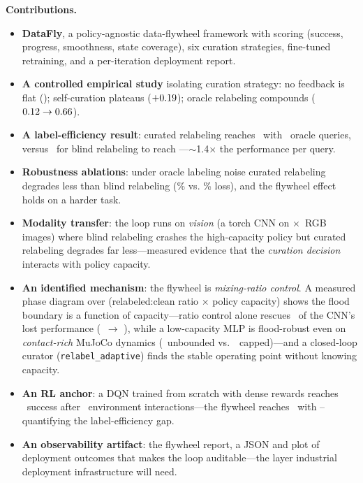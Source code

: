 \documentclass[conference]{IEEEtran}
\begin{document}
\textbf{Contributions.}
\begin{itemize}
\item \textbf{DataFly}, a policy-agnostic data-flywheel framework with
scoring (success, progress, smoothness, state coverage), six curation
strategies, fine-tuned retraining, and a per-iteration deployment report.
\item \textbf{A controlled empirical study} isolating curation strategy:
no feedback is flat (\baseSuccess); self-curation plateaus ($+0.19$);
oracle relabeling compounds ($0.12 \rightarrow 0.66$).
\item \textbf{A label-efficiency result}: curated relabeling reaches
\curatedFinal\ with \curatedQueries\ oracle queries, versus \blindQueries\
for blind relabeling to reach \relabelFinal---$\sim$1.4$\times$ the
performance per query.
\item \textbf{Robustness ablations}: under oracle labeling noise curated
relabeling degrades less than blind relabeling (\curatedDrop\% vs.
\blindDrop\% loss), and the flywheel effect holds on a harder task.
\item \textbf{Modality transfer}: the loop runs on \emph{vision} (a torch
CNN on \visionImg$\times$\visionImg\ RGB images) where blind relabeling
crashes the high-capacity policy but curated relabeling degrades far
less---measured evidence that the \emph{curation decision} interacts with
policy capacity.
\item \textbf{An identified mechanism}: the flywheel is \emph{mixing-ratio
control}. A measured phase diagram over (relabeled:clean ratio $\times$
policy capacity) shows the flood boundary is a function of capacity---ratio
control alone rescues \mixRescueGain\ of the CNN's lost performance
(\mixBlindFinal\ $\rightarrow$ \mixRescueFinal), while a low-capacity MLP
is flood-robust even on \emph{contact-rich} MuJoCo dynamics
(\contactBlindFinal\ unbounded vs.\ \contactMixFinal\ capped)---and a
closed-loop curator (\texttt{relabel\_adaptive}) finds the stable
operating point without knowing capacity.
\item \textbf{An RL anchor}: a DQN trained from scratch with dense rewards
reaches \dqnFinal\ success after \dqnSteps\ environment interactions---the
flywheel reaches \relabelFinal\ with \flywheelSteps\---quantifying the
label-efficiency gap.
\item \textbf{An observability artifact}: the flywheel report, a JSON and
plot of deployment outcomes that makes the loop auditable---the layer
industrial deployment infrastructure will need.
\end{itemize}
\end{document}
